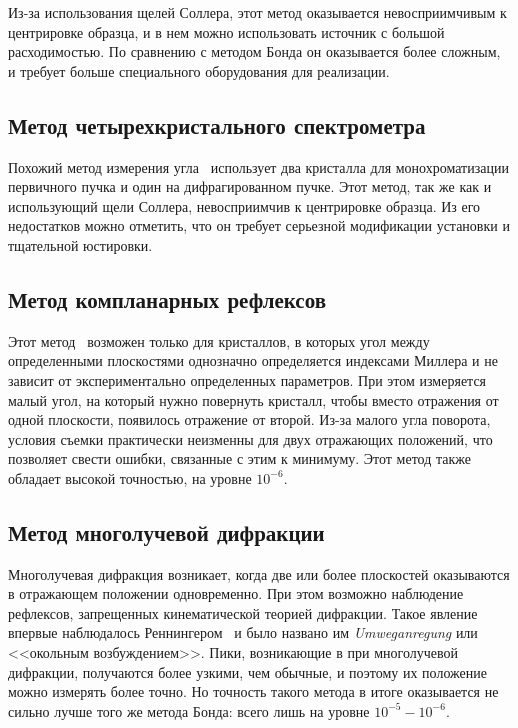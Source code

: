 Из-за использования щелей Соллера, этот метод оказывается невосприимчивым к центрировке образца, и в нем можно использовать источник с большой расходимостью.
По сравнению с методом Бонда он оказывается более сложным, и требует больше специального оборудования для реализации.

\subsection{Метод четырехкристального спектрометра}

Похожий метод измерения угла~\cite{Fewster:1989} использует два кристалла для монохроматизации первичного пучка и один на дифрагированном пучке.
Этот метод, так же как и использующий щели Соллера, невосприимчив к центрировке образца.
Из его недостатков можно отметить, что он требует серьезной модификации установки и тщательной юстировки.

\subsection{Метод компланарных рефлексов}

Этот метод~\cite{Isomae:1976} возможен только для кристаллов, в которых угол между определенными плоскостями однозначно определяется индексами Миллера и не зависит от экспериментально определенных параметров.
При этом измеряется малый угол, на который нужно повернуть кристалл, чтобы вместо отражения от одной плоскости, появилось отражение от второй.
Из-за малого угла поворота, условия съемки практически неизменны для двух отражающих положений, что позволяет свести ошибки, связанные с этим к минимуму.
Этот метод также обладает высокой точностью, на уровне $10^{-6}$.

\subsection{Метод многолучевой дифракции}

Многолучевая дифракция возникает, когда две или более плоскостей оказываются в отражающем положении одновременно.
При этом возможно наблюдение рефлексов, запрещенных кинематической теорией дифракции.
Такое явление впервые наблюдалось Реннингером~\cite{Renninger:1937} и было названо им \textit{Umweganregung} или <<окольным возбуждением>>.
Пики, возникающие в при многолучевой дифракции, получаются более узкими, чем обычные, и поэтому их положение можно измерять более точно.
Но точность такого метода в итоге оказывается не сильно лучше того же метода Бонда: всего лишь на уровне $10^{-5} - 10^{-6}$.

